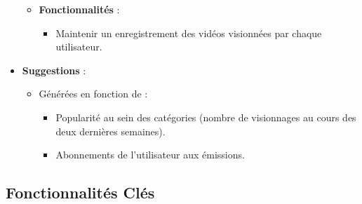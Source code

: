 \documentclass{article}
\begin{document}
\begin{itemize}
\begin{itemize}
        \item \textbf{Fonctionnalités} :
        \begin{itemize}
            \item Maintenir un enregistrement des vidéos visionnées par chaque utilisateur.
        \end{itemize}
    \end{itemize}
    \item \textbf{Suggestions} :
    \begin{itemize}
        \item Générées en fonction de :
        \begin{itemize}
            \item Popularité au sein des catégories (nombre de visionnages au cours des deux dernières semaines).
            \item Abonnements de l'utilisateur aux émissions.
        \end{itemize}
    \end{itemize}
\end{itemize}

\subsection{Fonctionnalités Clés}
\end{document}
